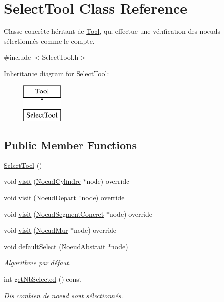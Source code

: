 \hypertarget{class_select_tool}{}\section{Select\+Tool Class Reference}
\label{class_select_tool}


Classe concrète héritant de \hyperlink{class_tool}{Tool}, qui effectue une vérification des noeuds sélectionnés comme le compte.  




{\ttfamily \#include $<$Select\+Tool.\+h$>$}

Inheritance diagram for Select\+Tool\+:\begin{figure}[H]
\begin{center}
\leavevmode
\includegraphics[height=2.000000cm]{class_select_tool}
\end{center}
\end{figure}
\subsection*{Public Member Functions}
\begin{DoxyCompactItemize}
\item 
\hyperlink{group__inf2990_ga2174af55e744036f0ccc5ce1fe25ddb1}{Select\+Tool} ()
\item 
void \hyperlink{group__inf2990_gacd9fee116b738725ab0f664029253fa0}{visit} (\hyperlink{class_noeud_cylindre}{Noeud\+Cylindre} $\ast$node) override
\item 
void \hyperlink{group__inf2990_ga392f7eb2a74106cff675878f5453a9d3}{visit} (\hyperlink{class_noeud_depart}{Noeud\+Depart} $\ast$node) override
\item 
void \hyperlink{group__inf2990_ga3e4db43bef245d0d88d49f018fee424f}{visit} (\hyperlink{class_noeud_segment_concret}{Noeud\+Segment\+Concret} $\ast$node) override
\item 
void \hyperlink{group__inf2990_gab6a7d46d8fad7c1045678b6dec3c9400}{visit} (\hyperlink{class_noeud_mur}{Noeud\+Mur} $\ast$node) override
\item 
void \hyperlink{group__inf2990_ga01b8ec1322baa74ee48e5087337bc959}{default\+Select} (\hyperlink{class_noeud_abstrait}{Noeud\+Abstrait} $\ast$node)
\begin{DoxyCompactList}\small\item\em Algorithme par défaut. \end{DoxyCompactList}\item 
int \hyperlink{group__inf2990_gaca4f60cc972b5d9df612f48c18c8364a}{get\+Nb\+Selected} () const 
\begin{DoxyCompactList}\small\item\em Dis combien de noeud sont sélectionnés. \end{DoxyCompactList}\end{DoxyCompactItemize}


